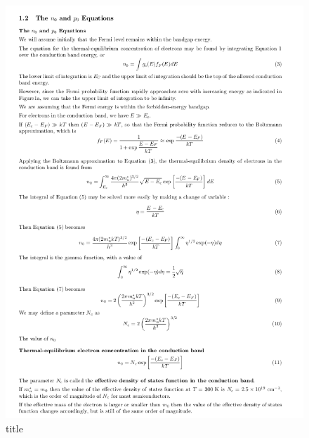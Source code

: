 \documentclass[11pt]{article}
\begin{document}
\begin{figure}
\centering
\includegraphics{media/DensityOfStates.png}
\caption{title}
\end{figure}
\end{document}

